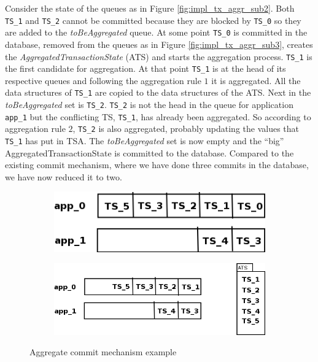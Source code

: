 Consider the state of the queues as in Figure
\ref{fig:impl_tx_aggr_sub2}. Both \texttt{TS\_1} and \texttt{TS\_2}
cannot be committed because they are blocked by \texttt{TS\_0} so they
are added to the \emph{toBeAggregated} queue. At some
point \texttt{TS\_0} is committed in the database, removed from the
queues as in Figure \ref{fig:impl_tx_aggr_sub3}, creates the
\emph{AggregatedTransactionState} (ATS)
and starts the aggregation process. \texttt{TS\_1} is the first
candidate for aggregation. At that point \texttt{TS\_1} is at the head
of its respective queues and following the aggregation rule $1$ it is
aggregated. All the data structures of \texttt{TS\_1} are copied to
the data structures of the ATS. Next in the \emph{toBeAggregated} set
is \texttt{TS\_2}. \texttt{TS\_2} is not the head in the queue for
application \texttt{app\_1} but the conflicting TS, \texttt{TS\_1}, has
already been aggregated. So according to aggregation rule $2$,
\texttt{TS\_2} is also aggregated, probably updating the values that
\texttt{TS\_1} has put in TSA. The \emph{toBeAggregated} set is now
empty and the ``big'' AggregatedTransactionState is committed to the
database. Compared to the existing commit mechanism, where we have
done three commits in the database, we have now reduced it to two.

\begin{figure}
\centering
\begin{subfigure}[t]{0.3\textwidth}
\includegraphics[scale=0.4]{resources/images/Implementation/commit_system_aggr_example.png}
\caption{}
\label{fig:impl_tx_aggr_ex0}
\end{subfigure}

\begin{subfigure}[t]{0.3\textwidth}
  \includegraphics[scale=0.4]{resources/images/Implementation/commit_system_aggr_example_1.png}
  \caption{}
  \label{fig:impl_tx_aggr_ex1}
\end{subfigure}
\caption{Aggregate commit mechanism example}
\label{fig:impl_tx_aggr_example}
\end{figure}

